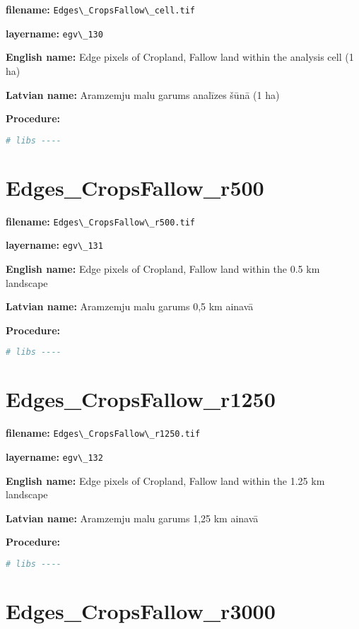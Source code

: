 \documentclass[
]{book}
\newcommand{\passthrough}[1]{#1}
\begin{document}
\textbf{filename:} \passthrough{\lstinline!Edges\_CropsFallow\_cell.tif!}

\textbf{layername:} \passthrough{\lstinline!egv\_130!}

\textbf{English name:} Edge pixels of Cropland, Fallow land within the analysis cell (1 ha)

\textbf{Latvian name:} Aramzemju malu garums analīzes šūnā (1 ha)

\textbf{Procedure:}

\begin{lstlisting}[language=R]
# libs ----
\end{lstlisting}

\section{Edges\_CropsFallow\_r500}\label{ch06.131}

\textbf{filename:} \passthrough{\lstinline!Edges\_CropsFallow\_r500.tif!}

\textbf{layername:} \passthrough{\lstinline!egv\_131!}

\textbf{English name:} Edge pixels of Cropland, Fallow land within the 0.5 km landscape

\textbf{Latvian name:} Aramzemju malu garums 0,5 km ainavā

\textbf{Procedure:}

\begin{lstlisting}[language=R]
# libs ----
\end{lstlisting}

\section{Edges\_CropsFallow\_r1250}\label{ch06.132}

\textbf{filename:} \passthrough{\lstinline!Edges\_CropsFallow\_r1250.tif!}

\textbf{layername:} \passthrough{\lstinline!egv\_132!}

\textbf{English name:} Edge pixels of Cropland, Fallow land within the 1.25 km landscape

\textbf{Latvian name:} Aramzemju malu garums 1,25 km ainavā

\textbf{Procedure:}

\begin{lstlisting}[language=R]
# libs ----
\end{lstlisting}

\section{Edges\_CropsFallow\_r3000}\label{ch06.133}
\end{document}
